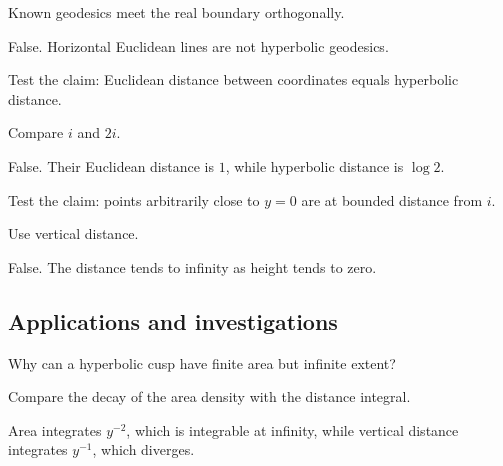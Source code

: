 \begin{hint}
Known geodesics meet the real boundary orthogonally.
\end{hint}

\begin{solution}
False.  Horizontal Euclidean lines are not hyperbolic geodesics.
\end{solution}

\begin{exercise}\label{exr:vii32-ped-11}
Test the claim: Euclidean distance between coordinates equals hyperbolic distance.
\end{exercise}

\begin{hint}
Compare \(i\) and \(2i\).
\end{hint}

\begin{solution}
False.  Their Euclidean distance is \(1\), while hyperbolic distance is \(\log2\).
\end{solution}

\begin{exercise}\label{exr:vii32-ped-12}
Test the claim: points arbitrarily close to \(y=0\) are at bounded distance from \(i\).
\end{exercise}

\begin{hint}
Use vertical distance.
\end{hint}

\begin{solution}
False.  The distance tends to infinity as height tends to zero.
\end{solution}

\subsection*{Applications and investigations}

\begin{exercise}\label{exr:vii32-ped-13}
Why can a hyperbolic cusp have finite area but infinite extent?
\end{exercise}

\begin{hint}
Compare the decay of the area density with the distance integral.
\end{hint}

\begin{solution}
Area integrates \(y^{-2}\), which is integrable at infinity, while vertical distance integrates \(y^{-1}\), which diverges.
\end{solution}

